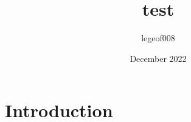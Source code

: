 \documentclass{article}
\title{test}
\author{legeof008 }
\date{December 2022}
\begin{document}
\maketitle

\section{Introduction}
\end{document}
